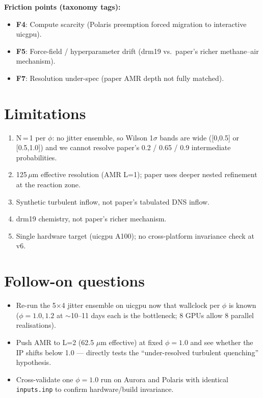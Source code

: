 \documentclass[11pt]{article}
\begin{document}
\noindent\textbf{Friction points (taxonomy tags):}
\begin{itemize}
\item \textbf{F4}: Compute scarcity (Polaris preemption forced migration to
  interactive uicgpu).
\item \textbf{F5}: Force-field / hyperparameter drift (drm19 vs.\ paper's
  richer methane--air mechanism).
\item \textbf{F7}: Resolution under-spec (paper AMR depth not fully matched).
\end{itemize}

\section{Limitations}
\begin{enumerate}
\item N\,=\,1 per \(\phi\): no jitter ensemble, so Wilson 1\(\sigma\) bands
  are wide ([0,0.5] or [0.5,1.0]) and we cannot resolve paper's 0.2 / 0.65
  / 0.9 intermediate probabilities.
\item 125\,\(\mu\)m effective resolution (AMR L=1); paper uses deeper
  nested refinement at the reaction zone.
\item Synthetic turbulent inflow, not paper's tabulated DNS inflow.
\item drm19 chemistry, not paper's richer mechanism.
\item Single hardware target (uicgpu A100); no cross-platform invariance
  check at v6.
\end{enumerate}

\section{Follow-on questions}
\begin{itemize}
\item Re-run the 5\(\times\)4 jitter ensemble on uicgpu now that wallclock
  per \(\phi\) is known (\(\phi\!=\!1.0,1.2\) at \(\sim\)10--11 days each
  is the bottleneck; 8 GPUs allow 8 parallel realisations).
\item Push AMR to L=2 (62.5 \(\mu\)m effective) at fixed \(\phi\!=\!1.0\)
  and see whether the IP shifts below 1.0 --- directly tests the
  ``under-resolved turbulent quenching'' hypothesis.
\item Cross-validate one \(\phi\!=\!1.0\) run on Aurora and Polaris with
  identical \texttt{inputs.inp} to confirm hardware/build invariance.
\end{itemize}
\end{document}
